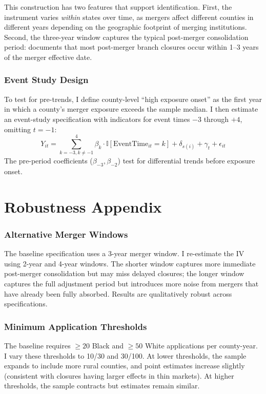 \documentclass[12pt]{article}
\newcommand{\ind}{\mathbb{I}}
\begin{document}
This construction has two features that support identification. First, the instrument varies \emph{within} states over time, as mergers affect different counties in different years depending on the geographic footprint of merging institutions. Second, the three-year window captures the typical post-merger consolidation period: \citet{nguyen2019} documents that most post-merger branch closures occur within 1--3 years of the merger effective date.

\subsubsection*{Event Study Design} To test for pre-trends, I define county-level ``high exposure onset'' as the first year in which a county's merger exposure exceeds the sample median. I then estimate an event-study specification with indicators for event times $-3$ through $+4$, omitting $t=-1$:
\begin{equation}
Y_{it} = \sum_{k=-3, k\neq -1}^{4} \beta_k \cdot \ind[\text{EventTime}_{it} = k] + \delta_{s(i)} + \gamma_t + \epsilon_{it}
\end{equation}
The pre-period coefficients ($\beta_{-3}, \beta_{-2}$) test for differential trends before exposure onset.


\section{Robustness Appendix}
\label{app:robustness}

\subsubsection*{Alternative Merger Windows} The baseline specification uses a 3-year merger window. I re-estimate the IV using 2-year and 4-year windows. The shorter window captures more immediate post-merger consolidation but may miss delayed closures; the longer window captures the full adjustment period but introduces more noise from mergers that have already been fully absorbed. Results are qualitatively robust across specifications.

\subsubsection*{Minimum Application Thresholds} The baseline requires $\geq 20$ Black and $\geq 50$ White applications per county-year. I vary these thresholds to 10/30 and 30/100. At lower thresholds, the sample expands to include more rural counties, and point estimates increase slightly (consistent with closures having larger effects in thin markets). At higher thresholds, the sample contracts but estimates remain similar.
\end{document}
